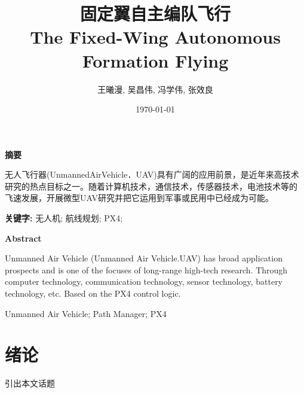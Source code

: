 \documentclass[UTF8,a4paper,10pt,nocolorlinks]{ctexart}
\title{
    \huge{\textbf{固定翼自主编队飞行}}\\
    \Large{\textbf{The Fixed-Wing Autonomous Formation Flying}}
}
\author{王曦漫, 吴昌伟, 冯学伟, 张效良}
\date{\today}
\begin{document}
    \maketitle   
    \tableofcontents
    \clearpage %
   
    \renewcommand{\abstractname}{摘要}  %
    \begin{center}
        \large{\textbf{摘要}}
    \end{center}
    \begin{adjustwidth}{0cm}{0cm}
        \hspace{2em} 无人飞行器(UnmannedAirVehicle．UAV)具有广阔的应用前景，是近年来高技术研究的热点目标之一。随着计算机技术，通信技术，传感器技术，电池技术等的
        飞速发展，开展微型UAV研究并把它运用到军事或民用中已经成为可能。
        \begin{flushleft}
        \par\textbf{关键字: } 无人机; 航线规划; PX4; %
        \end{flushleft}
    \end{adjustwidth}
    \thispagestyle{empty} %
    \clearpage

    \begin{center}
        \large{\textbf{Abstract}}
    \end{center}
    \begin{adjustwidth}{0cm}{0cm}
        \hspace{1em} Unmanned Air Vehicle (Unmanned Air Vehicle.UAV) has broad application prospects and is one of the focuses of long-range high-tech research. Through computer technology, communication technology, sensor technology, battery technology, etc.
        Based on the PX4 control logic.
    \end{adjustwidth}
    \begin{keywords}
        \noindent Unmanned Air Vehicle; Path Manager; PX4     
    \end{keywords}
    \thispagestyle{empty} %
    \clearpage %

    \setcounter{page}{1}        %
    \pagestyle{teststyle}
    \section{绪论}
        引出本文话题
\end{document}
